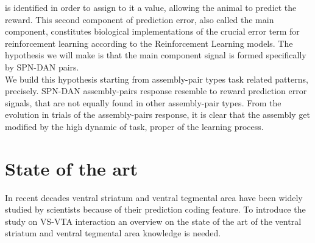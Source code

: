 is identified in order to assign to it a value, allowing the animal to predict the reward. This second component of prediction error, also called the main component, constitutes biological implementations of the crucial error term for reinforcement learning according to the Reinforcement Learning models. The hypothesis we will make is that the main component signal is formed specifically by SPN-DAN pairs.\\We build this hypothesis starting from assembly-pair types task related patterns, precisely. SPN-DAN assembly-pairs response resemble to reward prediction error signals, that are not equally found in other assembly-pair types. From the evolution in trials of the assembly-pairs response, it is clear that the assembly get modified by the high dynamic of task, proper of the learning process.

\section{State of the art}
\label{sec:StateArt}
 In recent decades ventral striatum and ventral tegmental area have been widely studied by scientists because of their prediction coding feature.
 To introduce the study on VS-VTA interaction an overview on the state of the art of the ventral striatum and ventral tegmental area knowledge is needed.

